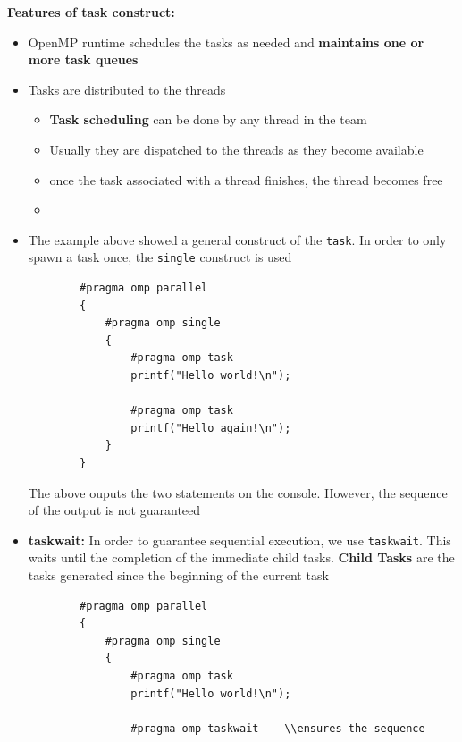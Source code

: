 \documentclass[12pt, a4paper]{report}
\begin{document}
{\bfseries{Features of task construct:}}
\begin{itemize}
    \item OpenMP runtime schedules the tasks as needed and {\bfseries{maintains one or more task queues}}
    \item Tasks are distributed to the threads
    \begin{itemize}
        \item {\bfseries{Task scheduling}} can be done by any thread in the team
        \item Usually they are dispatched to the threads as they become available
        \item once the task associated with a thread finishes, the thread becomes free
        \item 
    \end{itemize}
    \item The example above showed a general construct of the \verb$task$. In order to only spawn a task once, the \verb$single$ construct is used
    \begin{verbatim}
        #pragma omp parallel
        {
            #pragma omp single
            {
                #pragma omp task
                printf("Hello world!\n");

                #pragma omp task
                printf("Hello again!\n");
            }
        }
    \end{verbatim}
    The above ouputs the two statements on the console. However, the sequence of the output is not guaranteed
    \item {\bfseries{taskwait:}} In order to guarantee sequential execution, we use \verb$taskwait$. This waits until the completion of the immediate child 
          tasks. {\bfseries{Child Tasks}} are the tasks generated since the beginning of the current task
    \begin{verbatim}
        #pragma omp parallel
        {
            #pragma omp single
            {
                #pragma omp task
                printf("Hello world!\n");

                #pragma omp taskwait    \\ensures the sequence


\end{verbatim}
\end{itemize}
\end{document}
